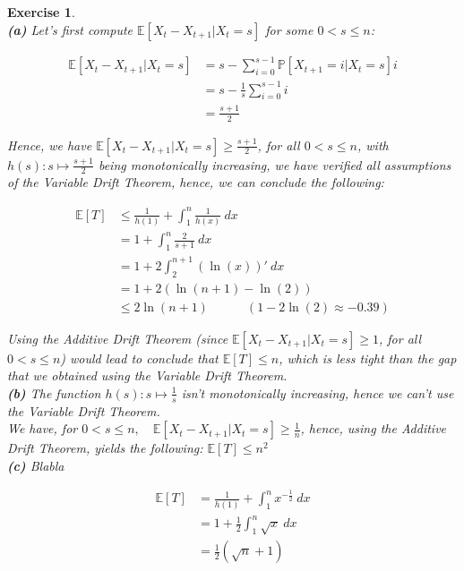 \documentclass{article}
\newtheorem{exo}{Exercise}
\def\P{\mathbb{P}}
\def\E{\mathbb{E}}
\begin{document}
\begin{exo}{\ \\}
\noindent
\textbf{(a)} Let's first compute $\E[X_t-X_{t+1}| X_t =s]$ for some $0 <s \leq n$:

\begin{align*}
    \E[X_t-X_{t+1}| X_t =s] 
    &= s - \sum_{i = 0}^{s-1} \P[X_{t+1}=i| X_t =s] i \\
    &= s - \frac{1}{s} \sum_{i = 0}^{s-1} i \\
    &= \frac{s+1}{2} 
\end{align*}

Hence, we have $\E[X_t-X_{t+1}| X_t =s] \geq \frac{s+1}{2}$, for all $0 <s \leq n$, with $h(s): s \mapsto \frac{s+1}{2}$ being monotonically increasing, we have verified all assumptions of the Variable Drift Theorem, hence, we can conclude the following:

\begin{align*}
    \E[T]
    &\leq \frac{1}{h(1)} + \int_{{1}}^{{n}} {\frac{1}{h(x)} } \: d{x} \\
    &= 1 + \int_{{1}}^{{n}} {\frac{2}{s+1}} \: d{x} \\
    &= 1 + 2 \int_{{2}}^{{n+1}} {(\ln(x))'} \: d{x} \\
    &= 1 + 2(\ln(n+1)-\ln(2)) \\
    &\leq 2\ln(n+1) \quad \quad \quad ( 1 - 2\ln(2) \approx  -0.39 )
\end{align*}

Using the Additive Drift Theorem (since $\E[X_t-X_{t+1}| X_t =s] \geq 1$, for all $0 <s \leq n$) would lead to conclude that $\E[T] \leq n$, which is less tight than the gap that we obtained using the Variable Drift Theorem. \\

\noindent
\textbf{(b)} The function $h(s)\colon s \mapsto \frac{1}{s}$ isn't monotonically increasing, hence we can't use the Variable Drift Theorem. \\

We have, for $0 <  s \leq n, \quad \E[X_t-X_{t+1}| X_t=s] \geq \frac{1}{n}$, hence, using the Additive Drift Theorem, yields the following: $\E[T] \leq n^2$ \\

\noindent
\textbf{(c)} Blabla

\begin{align*}
    \E[T]
    &= \frac{1}{h(1)} + \int_{{1}}^{{n}} {x^{-\frac{1}{2} }} \: d{x} \\
    &= 1 + \frac{1}{2} \int_{{1}}^{{n}} {\sqrt{x}} \: d{x} \\
    &= \frac{1}{2} (\sqrt{n}+1)
\end{align*}


\end{exo}
\end{document}
